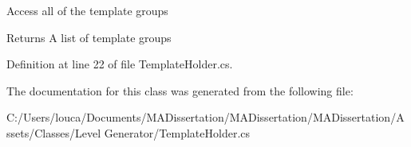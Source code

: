 Access all of the template groups 

\begin{DoxyReturn}{Returns}
A list of template groups
\end{DoxyReturn}


Definition at line 22 of file Template\+Holder.\+cs.



The documentation for this class was generated from the following file\+:\begin{DoxyCompactItemize}
\item 
C\+:/\+Users/louca/\+Documents/\+M\+A\+Dissertation/\+M\+A\+Dissertation/\+M\+A\+Dissertation/\+Assets/\+Classes/\+Level Generator/Template\+Holder.\+cs\end{DoxyCompactItemize}

